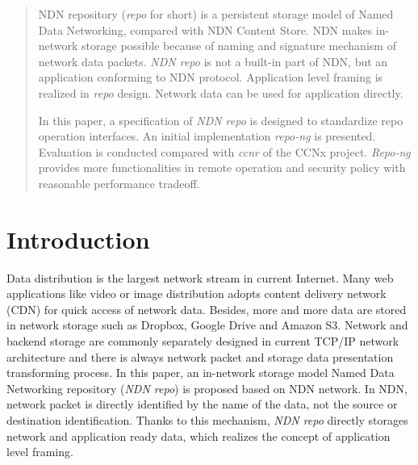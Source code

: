 \documentclass[conference]{IEEEtran}
\begin{document}
\begin{abstract}
NDN repository (\emph{repo} for short) is a persistent storage model of Named Data Networking, compared with NDN Content Store. NDN makes in-network storage possible because of naming and signature mechanism of network data packets. \emph{NDN repo} is not a built-in part of NDN, but an application conforming to NDN protocol. Application level framing is realized in \emph{repo} design. Network data can be used for application directly.

In this paper, a specification of \emph{NDN repo} is designed to standardize repo operation interfaces. An initial implementation \emph{repo-ng} is presented. Evaluation is conducted compared with \emph{ccnr} of the CCNx project. \emph{Repo-ng} provides more functionalities in remote operation and security policy with reasonable performance tradeoff.

\end{abstract}





%
\IEEEpeerreviewmaketitle

\section{Introduction}

Data distribution is the largest network stream in current Internet. Many web applications like video or image distribution adopts content delivery network (CDN) for quick access of network data. Besides, more and more data are stored in network storage such as Dropbox, Google Drive and Amazon S3. Network and backend storage are commonly separately designed in current TCP/IP network architecture and there is always network packet and storage data presentation transforming process. In this paper, an in-network storage model Named Data Networking repository (\emph{NDN repo}) is proposed based on NDN network. In NDN, network packet is directly identified by the name of the data, not the source or destination identification. Thanks to this mechanism, \emph{NDN repo} directly storages network and application ready data, which realizes the concept of application level framing. \cite{clark1990architectural}
\end{document}
